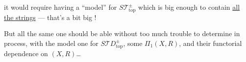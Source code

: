 it would require having a ``model'' for $S\mathcal T_{\mathrm{top}}^\pm$ which is big enough to contain  \uline{all} \uline{the strings} --- that's a bit big !

But all the same one should be able without too much trouble to determine in  process, with the model one  for $S\mathcal TD_{\mathrm{top}}^\pm$, some  $\Pi_1(X,R)$, and their functorial dependence on $(X,R)$\ldots
{}
